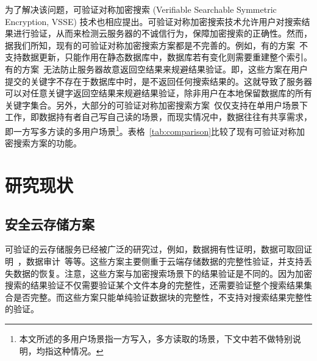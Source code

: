 为了解决该问题，可验证对称加密搜索 (Verifiable Searchable Symmetric Encryption, VSSE) 技术也相应提出\cite{kamara2011cs2,kurosawa2012uc,chai2012verifiable,kurosawa2013update,stefanov2014practical,cheng2015verifiable,bost2016verifiable,ogataefficient}。可验证对称加密搜索技术允许用户对搜索结果进行验证，从而来检测云服务器的不诚信行为，保障加密搜索的正确性。然而，据我们所知，现有的可验证对称加密搜索方案都是不完善的。例如，有的方案~\cite{kurosawa2012uc,chai2012verifiable,cheng2015verifiable,ogataefficient}不支持数据更新，只能作用在静态数据库中，数据库若有变化则需要重建整个索引。有的方案~\cite{kamara2011cs2,kurosawa2013update,stefanov2014practical}无法防止服务器故意返回空结果来规避结果验证。即，这些方案\cite{kamara2011cs2,kurosawa2013update,stefanov2014practical}在用户提交的关键字不存在于数据库中时，是不返回任何搜索结果的。这就导致了服务器可以对任意关键字返回空结果来规避结果验证，除非用户在本地保留数据库的所有关键字集合。另外，大部分的可验证对称加密搜索方案~\cite{kamara2011cs2,kurosawa2012uc,chai2012verifiable,kurosawa2013update,stefanov2014practical,
cheng2015verifiable,ogataefficient,bost2016verifiable}仅仅支持在单用户场景下工作，即数据持有者自己写自己读的场景，而现实情况中，数据往往有共享需求，即一方写多方读的多用户场景\footnote{本文所述的多用户场景指一方写入，多方读取的场景，下文中若不做特别说明，均指这种情况。}。表格~\ref{tab:comparison}比较了现有可验证对称加密搜索方案的功能。




\section{研究现状}
\subsection{安全云存储方案}
可验证的云存储服务已经被广泛的研究过，例如，数据拥有性证明，数据可取回证明~\cite{juels2007pors, bowers2009proofs, stefanov2012iris}，数据审计~\cite{wang2013privacy,wang2010privacy,wang2010toward}等等。这些方案主要侧重于云端存储数据的完整性验证，并支持丢失数据的恢复。注意，这些方案与加密搜索场景下的结果验证是不同的。因为加密搜索的结果验证不仅需要验证某个文件本身的完整性，还需要验证整个搜索结果集合是否完整。而这些方案只能单纯验证数据块的完整性，不支持对搜索结果完整性的验证。

